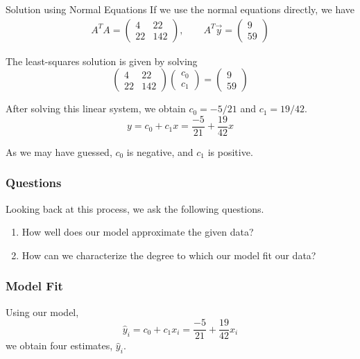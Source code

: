 \begin{frame}{Solution using Normal Equations}
If we use the normal equations directly, we have 
\begin{align*}
A ^{T} A = \begin{pmatrix} 4 & 22 \\ 22 & 142 \end{pmatrix} , \qquad 
A ^{T} \vec y = \begin{pmatrix} 9 \\ 59 \end{pmatrix}
\end{align*}

The least-squares solution is given by solving
\begin{equation*}
\begin{pmatrix}4 &22 \\  22 & 142 \end{pmatrix} \begin{pmatrix} c_0 \\ c_1 \end{pmatrix} = \begin{pmatrix} 9 \\ 59 \end{pmatrix}
\end{equation*}

After solving this linear system, we obtain $c_0 = -5/21$ and $c_1 = 19/42$. 
\begin{equation*}
    y = c _0 + c _1 x = \frac{-5}{21} + \frac{19}{42} x 
\end{equation*}

As we may have guessed, $c_0$ is negative, and $c_1$ is positive.
\end{frame}


\begin{frame}
\frametitle{Questions}

    Looking back at this process, we ask the following questions. 
    \begin{enumerate}
        \item <2-> How well does our model approximate the given data? 
        \item <3-> How can we characterize the degree to which our model fit our data? 
    \end{enumerate}
\end{frame}


\begin{frame}
\frametitle{Model Fit}
    
    Using our model, $$\widehat y_i = c_0 + c_1 x_i = \frac{-5}{21} + \frac{19}{42} x_i$$ we obtain four estimates, $\widehat y_i$.  

\end{frame}


